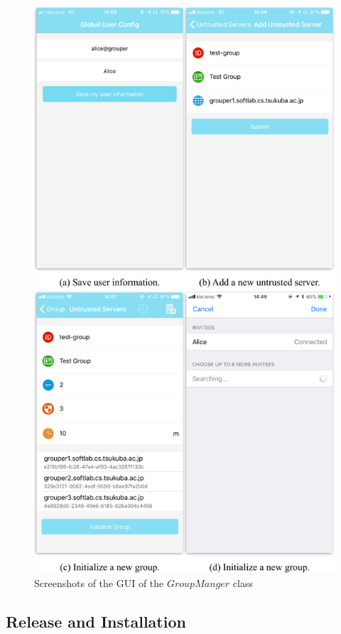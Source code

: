 \documentclass[a4paper,11pt]{report}
\begin{document}
\begin{figure}[H]
	\centering
	\includegraphics[scale=0.62]{group_manager_screenshot}
	\caption{Screenshots of the GUI of the $GroupManger$ class}
	\label{fig:group_manager_screenshot}
\end{figure}

\subsection{Release and Installation}
\end{document}
